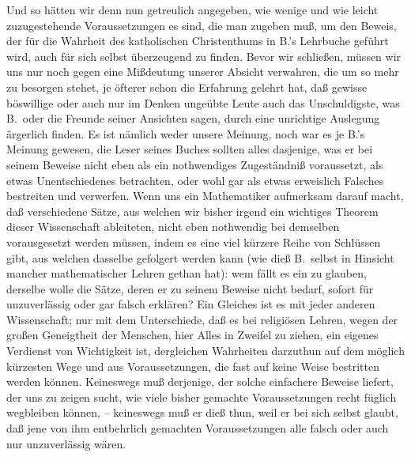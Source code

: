 Und so hätten wir denn nun getreulich angegeben, wie wenige und wie leicht zuzugestehende Voraussetzungen es sind, die man zugeben muß, um den Beweis, der für die Wahrheit des katholischen Christenthums in B.'s Lehrbuche geführt wird, auch für sich selbst überzeugend zu finden. Bevor wir schließen, müssen wir uns nur noch gegen eine Mißdeutung unserer Absicht verwahren, die um so mehr zu besorgen stehet, je öfterer schon die Erfahrung gelehrt hat, daß gewisse böswillige oder auch nur im Denken ungeübte Leute auch das Unschuldigste, was B.\ oder die Freunde seiner Ansichten sagen, durch eine unrichtige Auslegung ärgerlich finden. Es ist nämlich weder unsere Meinung, noch war es je B.'s Meinung gewesen, die Leser seines Buches sollten alles dasjenige, was er bei seinem Beweise nicht eben als ein nothwendiges Zugeständniß voraussetzt, als etwas Unentschiedenes betrachten, oder wohl gar als etwas erweislich Falsches bestreiten und verwerfen. Wenn uns ein Mathematiker aufmerksam darauf macht, daß verschiedene Sätze, aus welchen wir bisher irgend ein wichtiges Theorem dieser Wissenschaft ableiteten, nicht eben nothwendig bei demselben vorausgesetzt werden müssen, indem es eine viel kürzere Reihe von Schlüssen gibt, aus welchen dasselbe gefolgert werden kann (wie dieß B.\ selbst in Hinsicht mancher mathematischer Lehren gethan hat): wem fällt es ein zu glauben, derselbe wolle die Sätze, deren er zu seinem Beweise nicht bedarf, sofort für unzuverlässig oder gar falsch erklären? Ein Gleiches ist es mit jeder anderen Wissenschaft; nur mit dem Unterschiede, daß es bei religiösen Lehren, wegen der großen Geneigtheit der Menschen, hier Alles in Zweifel zu ziehen, ein eigenes Verdienst von Wichtigkeit ist, dergleichen Wahrheiten darzuthun auf dem möglich kürzesten Wege und aus Voraussetzungen, die fast auf keine Weise bestritten werden können. Keineswegs muß derjenige, der solche einfachere Beweise liefert, der uns zu zeigen sucht, wie viele bisher gemachte Voraussetzungen recht füglich wegbleiben können, -- keineswegs muß er dieß thun, weil er bei sich selbst glaubt, daß jene von ihm entbehrlich gemachten Voraussetzungen alle falsch oder auch nur unzuverlässig wären. \par
